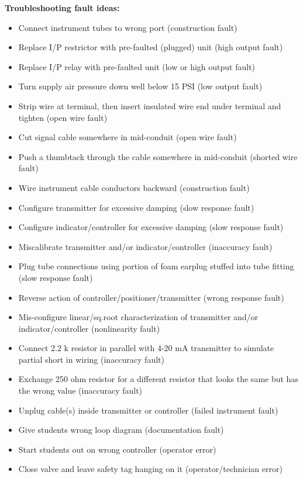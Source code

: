 \documentclass[12pt,a4paper]{article}
\begin{document}
\begin{itemize}
\noindent
{\bf Troubleshooting fault ideas:}

\begin{itemize}
\goodbreak
\item{} Connect instrument tubes to wrong port (construction fault)
\item{} Replace I/P restrictor with pre-faulted (plugged) unit (high output fault)
\item{} Replace I/P relay with pre-faulted unit (low or high output fault)
\item{} Turn supply air pressure down well below 15 PSI (low output fault)
\item{} Strip wire at terminal, then insert insulated wire end under terminal and tighten (open wire fault)
\item{} Cut signal cable somewhere in mid-conduit (open wire fault)
\item{} Push a thumbtack through the cable somewhere in mid-conduit (shorted wire fault)
\item{} Wire instrument cable conductors backward (construction fault)
\item{} Configure transmitter for excessive damping (slow response fault)
\item{} Configure indicator/controller for excessive damping (slow response fault)
\item{} Miscalibrate transmitter and/or indicator/controller (inaccuracy fault)
\item{} Plug tube connections using portion of foam earplug stuffed into tube fitting (slow response fault)
\item{} Reverse action of controller/positioner/transmitter (wrong response fault)
\item{} Mis-configure linear/sq.root characterization of transmitter and/or indicator/controller (nonlinearity fault)
\item{} Connect 2.2 k resistor in parallel with 4-20 mA transmitter to simulate partial short in wiring (inaccuracy fault)
\item{} Exchange 250 ohm resistor for a different resistor that looks the same but has the wrong value (inaccuracy fault) 
\item{} Unplug cable(s) inside transmitter or controller (failed instrument fault)
\item{} Give students wrong loop diagram (documentation fault)
\item{} Start students out on wrong controller (operator error)
\item{} Close valve and leave safety tag hanging on it (operator/technician error)
\end{itemize}










\end{itemize}
\end{document}
